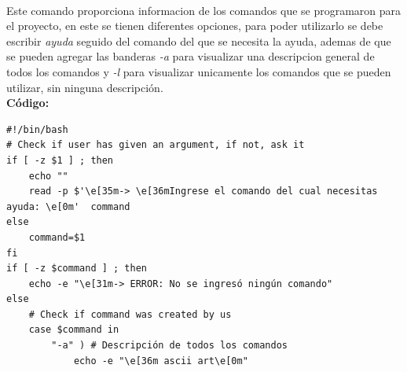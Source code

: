 \documentclass[12pt,a4paper]{article}
\begin{document}
    \justifying
    \noindent
    \\
    Este comando proporciona informacion de los comandos que se programaron para el proyecto, en este se tienen diferentes opciones, para poder utilizarlo se debe escribir \textit{ayuda} seguido del comando del que se necesita la ayuda, ademas de que se pueden agregar las banderas \textit{-a} para 
    visualizar una descripcion general de todos los comandos y \textit{-l} para visualizar unicamente los comandos que se pueden utilizar, sin ninguna descripción.
    \\
    \textbf{Código:}
    \begin{lstlisting}[style=BashInputStyle]
#!/bin/bash
# Check if user has given an argument, if not, ask it
if [ -z $1 ] ; then
    echo ""
    read -p $'\e[35m-> \e[36mIngrese el comando del cual necesitas ayuda: \e[0m'  command
else 
    command=$1
fi
if [ -z $command ] ; then
    echo -e "\e[31m-> ERROR: No se ingresó ningún comando"
else 
    # Check if command was created by us
    case $command in
        "-a" ) # Descripción de todos los comandos
            echo -e "\e[36m ascii art\e[0m"


\end{lstlisting}
\end{document}
